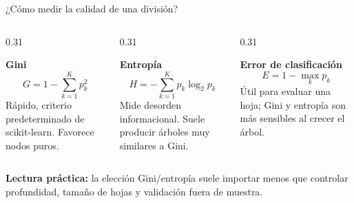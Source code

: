 \documentclass[aspectratio=169,11pt,table]{beamer}
\begin{document}
\begin{frame}{¿Cómo medir la calidad de una división?}
\footnotesize
\begin{columns}[T,onlytextwidth]
\begin{column}{0.31\textwidth}
\begin{ccdebox}
\centering
\textbf{Gini}\\[-0.05cm]
\[
G=1-\sum_{k=1}^{K}p_k^2
\]
\footnotesize
Rápido, criterio predeterminado de scikit-learn. Favorece nodos puros.
\end{ccdebox}
\end{column}
\begin{column}{0.31\textwidth}
\begin{ccdebox}
\centering
\textbf{Entropía}\\[-0.05cm]
\[
H=-\sum_{k=1}^{K}p_k\log_2p_k
\]
\footnotesize
Mide desorden informacional. Suele producir árboles muy similares a Gini.
\end{ccdebox}
\end{column}
\begin{column}{0.31\textwidth}
\begin{ccdebox}
\centering
\textbf{Error de clasificación}\\[-0.05cm]
\[
E=1-\max_k p_k
\]
\footnotesize
Útil para evaluar una hoja; Gini y entropía son más sensibles al crecer el árbol.
\end{ccdebox}
\end{column}
\end{columns}
\vspace{0.28cm}
\begin{keybox}
\textbf{Lectura práctica:} la elección Gini/entropía suele importar menos que controlar profundidad, tamaño de hojas y validación fuera de muestra.
\end{keybox}
\end{frame}
\end{document}
